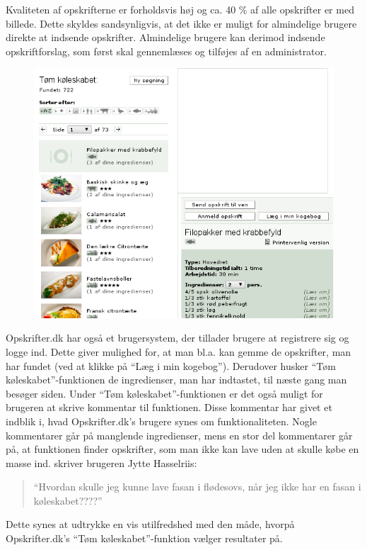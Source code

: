 Kvaliteten af opskrifterne er forholdsvis høj og ca. 40 \% af alle opskrifter er med billede. Dette skyldes sandsynligvis, at det ikke er muligt for almindelige brugere direkte at indsende opskrifter. Almindelige brugere kan derimod indsende opskriftforslag, som først skal gennemlæses og tilføjes af en administrator.

\begin{figure}
\centering
\includegraphics[scale=0.7]{billeder/forbilleder/opskrifterdk2.png}
\label{fig:opskrifterdk2}
\end{figure}

Opskrifter.dk har også et brugersystem, der tillader brugere at registrere sig og logge ind. Dette giver mulighed for, at man bl.a. kan gemme de opskrifter, man har fundet (ved at klikke på ``Læg i min kogebog''). Derudover husker ``Tøm køleskabet''-funktionen de ingredienser, man har indtastet, til næste gang man besøger siden.
Under ``Tøm køleskabet''-funktionen er det også muligt for brugeren at skrive kommentar til funktionen. Disse kommentar har givet et indblik i, hvad Opskrifter.dk’s brugere synes om funktionaliteten. Nogle kommentarer går på manglende ingredienser, mens en stor del kommentarer går på, at funktionen finder opskrifter, som man ikke kan lave uden at skulle købe en masse ind. \Fx skriver brugeren Jytte Hasselriis:

\begin{quote}
``Hvordan skulle jeg kunne lave fasan i flødesovs, når jeg ikke har en fasan i køleskabet????'' \cite{opskrift-fasan}
\end{quote}

Dette synes at udtrykke en vis utilfredshed med den måde, hvorpå Opskrifter.dk’s ``Tøm køleskabet''-funktion vælger resultater på.